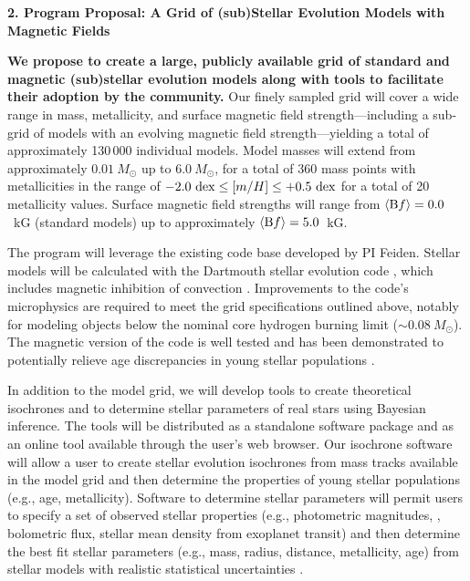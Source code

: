%

{\bf\large 2. Program Proposal: A Grid of (sub)Stellar Evolution Models with Magnetic Fields}  

{\bf We propose to create a large, publicly available grid of standard and magnetic (sub)stellar evolution models along with tools to facilitate their adoption by the community.} Our finely sampled grid will cover a wide range in mass, metallicity, and surface magnetic field strength---including a sub-grid of models with an evolving magnetic field strength---yielding a total of approximately 130\,000 individual models. Model masses will extend from approximately $0.01\ M_{\odot}$ up to $6.0\ M_{\odot}$, for a total of 360 mass points with metallicities in the range of $-2.0\ {\rm dex}\le [m/H] \le +0.5\ {\rm dex}$ for a total of 20 metallicity values. Surface magnetic field strengths will range from $\langle {\rm B}f\rangle = 0.0$~kG (standard models) up to approximately $\langle {\rm B}f\rangle = 5.0$~kG. 


The program will leverage the existing code base developed by PI Feiden. Stellar models will be calculated with the Dartmouth stellar evolution code \citep{Chaboyer2001, Bjork2006, Dotter2008}, which includes magnetic inhibition of convection \citep{FC12b}. Improvements to the code's microphysics are required to meet the grid specifications outlined above, notably for modeling objects below the nominal core hydrogen burning limit ($\sim 0.08\ M_{\odot}$). The magnetic version of the code is well tested \citep{FC12b, FC13, FC14, FC14b} and has been demonstrated to potentially relieve age discrepancies in young stellar populations \citep{Feiden2016}. 

In addition to the model grid, we will develop tools to create theoretical isochrones and to determine stellar parameters of real stars using Bayesian inference. The tools will be distributed as a standalone software package and as an online tool available through the user's web browser. Our isochrone software will allow a user to create stellar evolution isochrones from mass tracks available in the model grid and then determine the properties of young stellar populations (e.g., age, metallicity). Software to determine stellar parameters will permit users to specify a set of observed stellar properties (e.g., photometric magnitudes, \teff, bolometric flux, stellar mean density from exoplanet transit) and then determine the best fit stellar parameters (e.g., mass, radius, distance, metallicity, age) from stellar models with realistic statistical uncertainties \citep[see, e.g.,][]{Mann2016}. 

